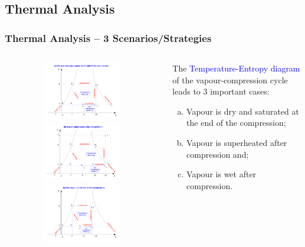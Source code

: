 \documentclass[10pt,compress,handout,ignorenonframetext]{beamer}
\begin{document}
\subsection{Thermal Analysis}
\begin{frame}
 \frametitle{Thermal Analysis -- 3 Scenarios/Strategies}
 \begin{columns}
  \begin{column}[c]{0.65\linewidth}
   \begin{figure}%
     \vbox{
      \includegraphics[width=5.4cm,height=2.6cm,clip]{./Pics/Overview_Refrig14}
      \vspace{-.1cm}
      \includegraphics[width=5.4cm,height=2.6cm,clip]{./Pics/Overview_Refrig15}
      \vspace{-.1cm}
      \includegraphics[width=5.4cm,height=2.6cm,clip]{./Pics/Overview_Refrig16}}
   \end{figure}  
  \end{column}  
  \begin{column}[c]{0.35\linewidth}
The \textcolor{blue}{Temperature-Entropy diagram} of the vapour-compression cycle leads to 3 important cases:
   \begin{enumerate}[(a)]
    \item <2-> Vapour is dry and saturated at the end of the compression;
    \item <3-> Vapour is superheated after compression and;
    \item <4-> Vapour is wet after compression.
   \end{enumerate}
  \end{column}  
 \end{columns}
\end{frame}
\end{document}
